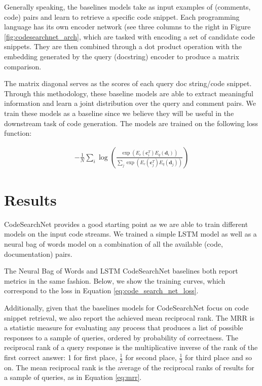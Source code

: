 \documentclass{article}
\begin{document}
Generally speaking, the baselines models take as input examples of (comments, code) pairs and learn to retrieve a specific code snippet. Each programming language has its own encoder network (see three columns to the right in Figure \ref{fig:codesearchnet_arch}, which are tasked with encoding a set of candidate code snippets. They are then combined through a dot product operation with the embedding generated by the query (docstring) encoder to produce a matrix comparison. 

The matrix diagonal serves as the scores of each query doc string/code snippet. Through this methodology, these baseline models are able to extract meaningful information and learn a joint distribution over the query and comment pairs. We train these models as a baseline since we believe they will be useful in the downstream task of code generation. The models are trained on the following loss function:

\begin{align}
    -\frac{1}{N}\sum_i \log \left( \frac{\exp(E_c(\textbf{c}_i^T)E_q(\textbf{d}_i))}{\sum_{j} \exp(E_c(\textbf{c}_j^T)E_q(\textbf{d}_j))}  \right)
    \label{eq:code_search_net_loss}
\end{align}

\section{Results}
\label{sec:results}
CodeSearchNet provides a good starting point as we are able to train different models on the input code streams. We trained a simple LSTM model as well as a neural bag of words model on a combination of all the available (code, documentation) pairs.

The Neural Bag of Words and LSTM CodeSearchNet baselines both report metrics in the same fashion. Below, we show the training curves, which correspond to the loss in Equation \eqref{eq:code_search_net_loss}.

Additionally, given that the baselines models for CodeSearchNet focus on code snippet retrieval, we also report the achieved mean reciprocal rank. The MRR is a statistic measure for evaluating any process that produces a list of possible responses to a sample of queries, ordered by probability of correctness. The reciprocal rank of a query response is the multiplicative inverse of the rank of the first correct answer: 1 for first place, $\frac{1}{2}$ for second place, $\frac{1}{3}$ for third place and so on. The mean reciprocal rank is the average of the reciprocal ranks of results for a sample of queries, as in Equation \eqref{eq:mrr}.
\end{document}
